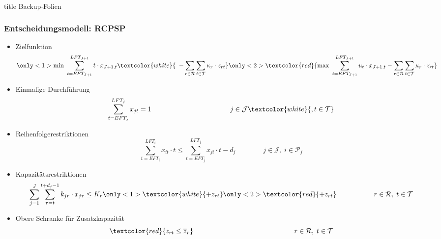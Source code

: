 \begin{frame}[noframenumbering]
\vfill
\begin{center}
\begin{beamercolorbox}[sep=8pt,center]{title}
Backup-Folien
\end{beamercolorbox}
\end{center}
\vfill
\end{frame}

\begin{frame}[noframenumbering]
\frametitle{Entscheidungsmodell: RCPSP}
\begin{footnotesize}
\begin{itemize}
\item Zielfunktion\\[-7mm]
\[
		\only<1>{\mbox{min } \sum_{t=EFT_{J+1}}^{LFT_{J+1}} t \cdot x_{{J+1},t} \textcolor{white}{\enspace - \sum_{r \in \mathcal{R}} \sum_{t \in \mathcal{T}} \kappa_r \cdot z_{rt}}}\only<2>{\textcolor{red}{\mbox{max } \sum_{t=EFT_{J+1}}^{LFT_{J+1}} u_t \cdot x_{{J+1},t} - \sum_{r \in \mathcal{R}} \sum_{t \in \mathcal{T}} \kappa_r \cdot z_{rt}}}
\]

\item Einmalige Durchführung
\[
\sum_{t=EFT_j}^{LFT_j} x_{jt} = 1 \,\,\,\quad\quad\quad\quad\quad\quad\quad\quad\quad\quad\quad j \in \mathcal{J}\textcolor{white}{, t \in \mathcal{T}}
\]

\item Reihenfolgerestriktionen
\[
\sum_{t=EFT_i}^{LFT_i} x_{it} \cdot t \leq \sum_{t=EFT_j}^{LFT_j} x_{jt} \cdot t - d_j \,\,\:\:\:\quad\quad\quad j \in \mathcal{J}, \; i \in \mathcal{P}_j
\]

\item Kapazitätsrestriktionen
\[
\sum_{j=1}^{J} \sum_{\tau=t}^{t+d_j-1} k_{jr} \cdot x_{j\tau} \leq K_r\only<1>{\textcolor{white}{ + z_{rt}}}\only<2>{ \textcolor{red}{+ z_{rt}}} \,\,\:\:\:\:\:\quad\quad\quad\quad r \in \mathcal{R}, \; t \in \mathcal{T}
\]

\item<2> Obere Schranke für Zusatzkapazität\\[-3mm]
\[
\textcolor{red}{z_{rt} \leq \overline{z}_r} \,\;\;\quad\quad\quad\quad\quad\quad\quad\quad\quad\quad\quad\quad\quad\quad r \in \mathcal{R}, \; t \in \mathcal{T}
\]
\end{itemize}
\end{footnotesize}
\end{frame}


